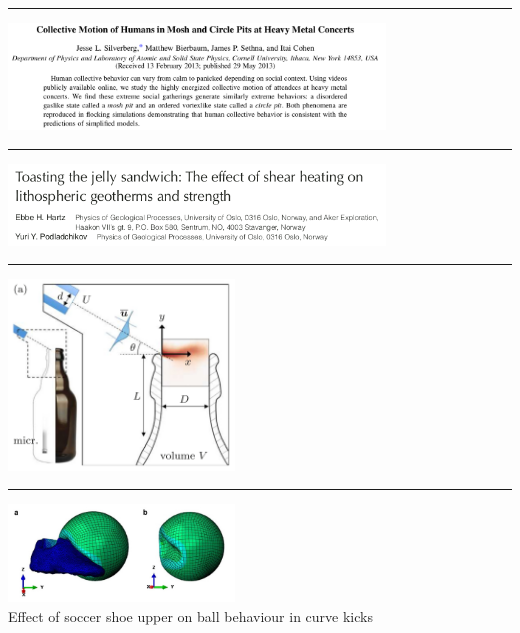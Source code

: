 \par\noindent\rule{\textwidth}{0.4pt}
\begin{center}
\includegraphics[width=10cm]{images/interesting/sibs13} {\tiny \cite{sibs13}}
\end{center}

\par\noindent\rule{\textwidth}{0.4pt}
\begin{center}
\includegraphics[width=10cm]{images/interesting/hapo08} {\tiny \cite{hapo08}}
\end{center}

\par\noindent\rule{\textwidth}{0.4pt}
\begin{center}
\includegraphics[width=6cm]{images/interesting/bobx20} {\tiny \cite{bobx20}}
\end{center}

\par\noindent\rule{\textwidth}{0.4pt}
\begin{center}
\includegraphics[width=6cm]{images/interesting/issm14}\\ {\captionfont
Effect of soccer shoe upper on ball behaviour in curve kicks \cite{issm14}}
\end{center}

